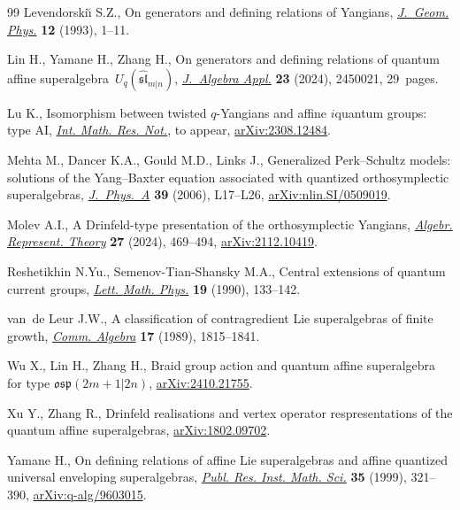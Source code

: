 \documentclass[pdftex]{sigma}
\numberwithin{equation}{section}
\begin{document}
\begin{thebibliography}{99}
Levendorski\u{\i} S.Z., On generators and defining relations of {Y}angians,
 \href{https://doi.org/10.1016/0393-0440(93)90084-R}{\textit{J.~Geom. Phys.}} \textbf{12} (1993), 1--11.

Lin H., Yamane H., Zhang H., On generators and defining relations of quantum
 affine superalgebra~{$U_q (\widehat{\mathfrak{sl}}_{m|n})$},
 \href{https://doi.org/10.1142/S021949882450021X}{\textit{J.~Algebra Appl.}} \textbf{23} (2024), 2450021, 29~pages.

Lu K., Isomorphism between twisted $q$-Yangians and affine $i$quantum groups:
 type AI, \href{https://doi.org/10.1093/imrn/rnae248}{\textit{Int. Math. Res. Not.}}, {t}o appear, \href{https://arxiv.org/abs/2308.12484}{arXiv:2308.12484}.

Mehta M., Dancer K.A., Gould M.D., Links J., Generalized {P}erk--{S}chultz
 models: solutions of the {Y}ang--{B}axter equation associated with quantized
 orthosymplectic superalgebras, \href{https://doi.org/10.1088/0305-4470/39/1/L03}{\textit{J.~Phys.~A}} \textbf{39} (2006),
 L17--L26, \href{https://arxiv.org/abs/nlin.SI/0509019}{arXiv:nlin.SI/0509019}.

Molev A.I., A {D}rinfeld-type presentation of the orthosymplectic {Y}angians,
 \href{https://doi.org/10.1007/s10468-023-10227-9}{\textit{Algebr. Represent. Theory}} \textbf{27} (2024), 469--494,
 \href{https://arxiv.org/abs/2112.10419}{arXiv:2112.10419}.

Reshetikhin N.Yu., Semenov-Tian-Shansky M.A., Central extensions of quantum
 current groups, \href{https://doi.org/10.1007/BF01045884}{\textit{Lett. Math. Phys.}} \textbf{19} (1990), 133--142.

van~de Leur J.W., A classification of contragredient {L}ie superalgebras of
 finite growth, \href{https://doi.org/10.1080/00927878908823823}{\textit{Comm. Algebra}} \textbf{17} (1989), 1815--1841.

Wu X., Lin H., Zhang H., Braid group action and quantum affine superalgebra for
 type $\mathfrak{osp}(2m+1|2n)$, \href{https://arxiv.org/abs/2410.21755}{arXiv:2410.21755}.

Xu Y., Zhang R., Drinfeld realisations and vertex operator respresentations of
 the quantum affine superalgebras, \href{https://arxiv.org/abs/1802.09702}{arXiv:1802.09702}.

Yamane H., On defining relations of affine {L}ie superalgebras and affine
 quantized universal enveloping superalgebras, \href{https://doi.org/10.2977/prims/1195143607}{\textit{Publ. Res. Inst. Math.
 Sci.}} \textbf{35} (1999), 321--390, \href{https://arxiv.org/abs/q-alg/9603015}{arXiv:q-alg/9603015}.


\end{thebibliography}
\end{document}
